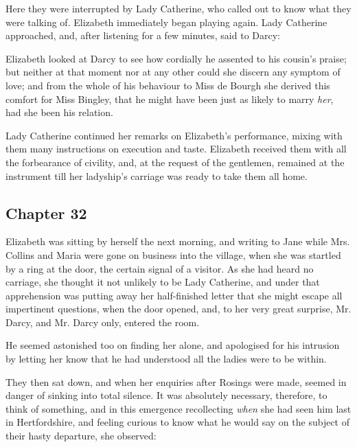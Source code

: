 Here they were interrupted by Lady Catherine, who called out to know what they were talking of. Elizabeth immediately began playing again. Lady Catherine approached, and, after listening for a few minutes, said to Darcy:


Elizabeth looked at Darcy to see how cordially he assented to his cousin's praise; but neither at that moment nor at any other could she discern any symptom of love; and from the whole of his behaviour to Miss de Bourgh she derived this comfort for Miss Bingley, that he might have been just as likely to marry {\em her}, had she been his relation.

Lady Catherine continued her remarks on Elizabeth's performance, mixing with them many instructions on execution and taste. Elizabeth received them with all the forbearance of civility, and, at the request of the gentlemen, remained at the instrument till her ladyship's carriage was ready to take them all home.

\subsection[chapter-32]{\useURL[url32][][][]\from[url32] Chapter 32}

Elizabeth was sitting by herself the next morning, and writing to Jane while Mrs. Collins and Maria were gone on business into the village, when she was startled by a ring at the door, the certain signal of a visitor. As she had heard no carriage, she thought it not unlikely to be Lady Catherine, and under that apprehension was putting away her half-finished letter that she might escape all impertinent questions, when the door opened, and, to her very great surprise, Mr. Darcy, and Mr. Darcy only, entered the room.

He seemed astonished too on finding her alone, and apologised for his intrusion by letting her know that he had understood all the ladies were to be within.

They then sat down, and when her enquiries after Rosings were made, seemed in danger of sinking into total silence. It was absolutely necessary, therefore, to think of something, and in this emergence recollecting {\em when} she had seen him last in Hertfordshire, and feeling curious to know what he would say on the subject of their hasty departure, she observed:

